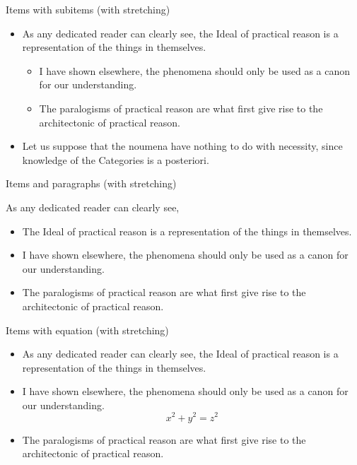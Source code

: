 \documentclass{beamer}
\let\svpar\par
\let\svitemize\itemize
\let\svenditemize\enditemize
\let\svitem\item
\def\newpar{\def\par{\svpar\vfill}}
\def\newitem{\def\item{\vfill\svitem}}
\let\svcenter\center
\let\svendcenter\endcenter
\let\svcolumn\column
\let\svendcolumn\endcolumn
\newlength\columnskip
\def\newcolumn{%
  \renewenvironment{column}[2]%
    {\svcolumn{##1}\setlength{\parskip}{\columnskip}##2}%
    {\svendcolumn\vspace{\columnskip}}}
\newcommand\stretchy{\only<2>{%
  \newpar\def\item{\svitem\newitem}%
  \renewenvironment{itemize}{\svitemize}{\svenditemize\newpar\par}%
  \renewenvironment{center}{\svcenter\newpar}{\svendcenter\newpar}%
  \newcolumn
}}
\begin{document}
\begin{frame}{Items with subitems (with stretching)}
\stretchy

\begin{itemize}
\item As any dedicated reader can clearly see, the Ideal of practical reason is a representation of the things in themselves.
\begin{itemize}
\item I have shown elsewhere, the phenomena should only be used as a canon for our understanding.
\item The paralogisms of practical reason are what first give rise to the architectonic of practical reason.
\end{itemize}
\item Let us suppose that the noumena have nothing to do with necessity, since knowledge of the Categories is a posteriori.
\end{itemize}
\end{frame}

\begin{frame}{Items and paragraphs (with stretching)}
\stretchy

As any dedicated reader can clearly see,
\begin{itemize}
\item The Ideal of practical reason is a representation of the things in themselves.
\item I have shown elsewhere, the phenomena should only be used as a canon for our understanding.
\item The paralogisms of practical reason are what first give rise to the architectonic of practical reason.
\end{itemize}
\end{frame}

\begin{frame}{Items with equation (with stretching)}
\stretchy

\begin{itemize}
\item As any dedicated reader can clearly see, the Ideal of practical reason is a representation of the things in themselves.
\item I have shown elsewhere, the phenomena should only be used as a canon for our understanding.
\begin{equation*}
x^2 + y^2 = z^2
\end{equation*}
\item The paralogisms of practical reason are what first give rise to the architectonic of practical reason.
\end{itemize}
\end{frame}
\end{document}
